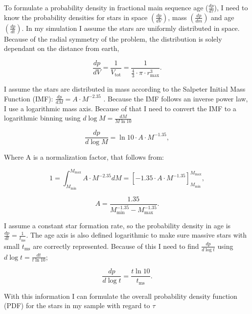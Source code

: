\documentclass[a4paper,10pt]{article}
\begin{document}
 To formulate a probability density in fractional main sequence age ($\frac{dp}{d\tau}$), I need to know the probability densities for stars in space 
 $\left(\frac{dp}{dV}\right)$, mass 
 $\left(\frac{dp}{dm}\right)$ and age $\left(\frac{dp}{dt}\right)$. In my simulation I assume the stars are uniformly distributed in space. 
 Because of the radial symmetry of the problem, the distribution is solely dependant on the distance from earth,
 
 \begin{equation}
  \frac{dp}{dV}=\frac{1}{V_{\mathrm{tot}}}=\frac{1}{\frac43\cdot\pi\cdot r_{\mathrm{max}}^3}.
  \label{dpdV}
 \end{equation}
 
  I assume the stars are distributed in mass according to the Salpeter Initial Mass Function (IMF):
 $\frac{dp}{dM}=A\cdot M^{-2.35}$ \citep*{1955ApJ...121..161S}. Because the IMF follows an inverse power law, I use a logarithmic mass axis.
 Because of that I need to convert the IMF to a logarithmic binning using $d\log M = \frac{dM}{M\ln 10}$
 
 \begin{equation}
  \frac{dp}{d\log M}=\ln 10 \cdot A\cdot M^{-1.35},
 \end{equation}
 
 Where A is a normalization factor, that follows from: 
 
 \begin{equation}
  1=\int_{M_{\mathrm{min}}}^{M_{\mathrm{max}}}A\cdot M^{-2.35} dM =\left[ -1.35\cdot A\cdot M^{-1.35}\right]_{M_{\mathrm{min}}}^{M_{\mathrm{max}}},
 \end{equation}
 
 \begin{equation}
  A= \frac{1.35}{M_{\mathrm{min}}^{-1.35}-M_{\mathrm{max}}^{-1.35}}.
 \end{equation}
 
 I assume a constant star formation rate, so the probability density in age is $\frac{dp}{dt}=\frac{1}{t_{\mathrm{ms}}}$. 
 The age axis is also defined logarithmic to make sure massive stars with small $t_{\mathrm{ms}}$ are correctly represented.
 Because of this I need to find $\frac{dp}{d\log t}$ using $d\log t=\frac{dt}{t \ln 10}$; 

 \begin{equation}
  \frac{dp}{d\log t}=\frac{t\ln 10}{t_{\mathrm{ms}}}.
 \end{equation}

 With this information I can formulate the overall probability density function (PDF) for the stars in my sample with regard to $\tau$
 
\end{document}
